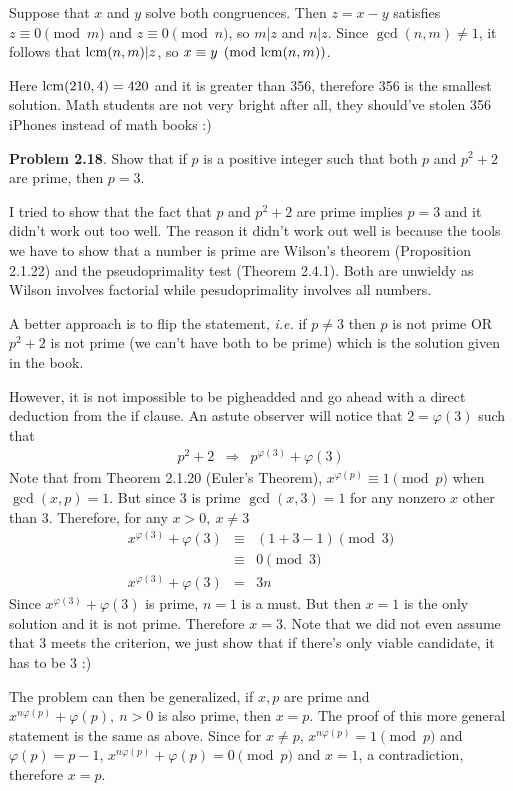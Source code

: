 \documentclass[aps,preprint,preprintnumbers,nofootinbib,showpacs,prd]{revtex4-1}
\newcommand{\ie}{{\it i.e.} }
\newcommand{\nbea}{\begin{eqnarray*}}
\newcommand{\neea}{\end{eqnarray*}}
\begin{document}
Suppose that $x$ and $y$ solve both congruences. Then $z = x − y$ satisfies $z \equiv 0 \pmod{m}$ and $z \equiv 0 \pmod{n}$, so $m|z$ and $n|z$. Since $\gcd(n, m) \neq 1$, it follows that ${\rm lcm}(n,m) | z$, so $x \equiv y \pmod{ {\rm lcm}(n,m)}$.

Here ${\rm lcm}(210,4)=420$ and it is greater than 356, therefore 356 is the smallest solution. Math students are not very bright after all, they should've stolen 356 iPhones instead of math books :)

{\bf Problem 2.18}. Show that if $p$ is a positive integer such that both $p$ and $p^2 + 2$ are prime, then $p = 3$.

I tried to show that the fact that $p$ and $p^2 + 2$ are prime implies $p=3$ and it didn't work out too well. The reason it didn't work out well is because the tools we have to show that a number is prime are Wilson's theorem (Proposition 2.1.22) and the pseudoprimality test (Theorem 2.4.1). Both are unwieldy as Wilson involves factorial while pesudoprimality involves all numbers.

A better approach is to flip the statement, \ie if $p \neq 3$ then $p$ is not prime OR $p^2 + 2$ is not prime (we can't have both to be prime) which is the solution given in the book.

However, it is not impossible to be pigheadded and go ahead with a direct deduction from the if clause. An astute observer will notice that $2 = \varphi(3)$ such that
%
\nbea
p^2 + 2 & \Longrightarrow & p^{\varphi(3)} + \varphi(3)
\neea
%
Note that from Theorem 2.1.20 (Euler's Theorem), $x^{\varphi(p)} \equiv 1 \pmod{p}$ when $\gcd(x,p)=1$. But since 3 is prime $\gcd(x,3)=1$ for any nonzero $x$ other than 3. Therefore, for any $x > 0,~x \neq 3$
%
\nbea
x^{\varphi(3)} + \varphi(3) & \equiv & (1 + 3 - 1) \pmod{3} \\
 & \equiv & 0 \pmod{3} \\
x^{\varphi(3)} + \varphi(3) & = & 3n
\neea
%
Since $x^{\varphi(3)} + \varphi(3)$ is prime, $n=1$ is a must. But then $x=1$ is the only solution and it is not prime. Therefore $x=3$. Note that we did not even assume that $3$ meets the criterion, we just show that if there's only viable candidate, it has to be 3 :)

The problem can then be generalized, if $x, p$ are prime and $x^{n\varphi(p)} + {\varphi(p)}, ~n > 0$ is also prime, then $x=p$. The proof of this more general statement is the same as above. Since for $x \neq p$, $x^{n\varphi(p)} = 1 \pmod{p}$ and $\varphi(p) = p-1$, $x^{n\varphi(p)} + {\varphi(p)} = 0 \pmod{p}$ and $x=1$, a contradiction, therefore $x=p$.
\end{document}
